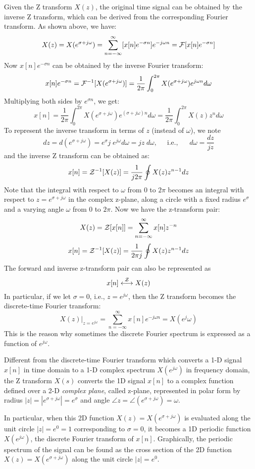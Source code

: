Given the Z transform $X(z)$, the original time signal can be obtained by 
the inverse Z transform, which can be derived from the corresponding Fourier 
transform. As shown above, we have:
\[ X(z)=X(e^{\sigma+j\omega})=\sum_{n=-\infty}^\infty [x[n] e^{-\sigma n}] 
e^{-j\omega n} ={\cal F}[x[n] e^{-\sigma n}]
\]
Now $x[n]e^{-\sigma n}$ can be obtained by the inverse Fourier transform:
\[ x[n] e^{-\sigma n}={\cal F}^{-1}[X(e^{\sigma+j\omega})]
=\frac{1}{2\pi}\int_0^{2\pi} X(e^{\sigma+j\omega}) e^{j\omega n} d\omega
\]
Multiplying both sides by $e^{\sigma n}$, we get:
\[ 
x[n]=\frac{1}{2\pi}\int_0^{2\pi} X(e^{\sigma+j\omega}) e^{(\sigma+j\omega) n} d\omega 
=\frac{1}{2\pi}\int_0^{2\pi} X(z) z^n d\omega 
\]
To represent the inverse transform in terms of $z$ (instead of $\omega$), we note
\[ dz=d(e^{\sigma+j\omega})=e^\sigma j\;e^{j\omega} d\omega=jz\;d\omega,
 \;\;\;\;\;\mbox{i.e.,}\;\;\;\;\;\;d\omega=\frac{dz}{jz}	\]
and the inverse Z transform can be obtained as:
\[ x[n]={\cal Z}^{-1}[X(z)]=\frac{1}{j2\pi}\oint X(z) z^{n-1} dz	\]
Note that the integral with respect to $\omega$ from $0$ to $2\pi$ becomes
an integral with respect to $z=e^{\sigma+j\omega}$ in the complex z-plane,
along a circle with a fixed radius $e^\sigma$ and a varying angle $\omega$ 
from $0$ to $2\pi$. Now we have the z-transform pair:
\[	X(z)={\cal Z}[x[n]]=\sum_{n=-\infty}^\infty x[n]z^{-n}	\]
\[	x[n]={\cal Z}^{-1}[X(z)]=\frac{1}{2\pi j}\oint X(z)z^{n-1} dz	\]
The forward and inverse z-transform pair can also be represented as
\[	x[n] \stackrel{ {\cal Z} }{\longleftrightarrow} X(z)	\]
In particular, if we let $\sigma=0$, i.e., $z=e^{j\omega}$, then the Z
transform becomes the discrete-time Fourier transform:
\[ X(z)\bigg|_{z=e^{j\omega}}=\sum_{n=-\infty}^\infty x[n] e^{-j\omega n}=X(e^j\omega) \]
This is the reason why sometimes the discrete Fourier spectrum is expressed 
as a function of $e^{j\omega}$.


Different from the discrete-time Fourier transform which converts a 1-D signal
$x[n]$ in time domain to a 1-D complex spectrum $X(e^{j\omega})$ in frequency
domain, the Z transform $X(s)$ converts the 1D signal $x[n]$ to a complex 
function defined over a 2-D {\em complex plane}, called z-plane, represented
in polar form by radius $|z|=|e^{\sigma+j\omega}|=e^\sigma$ and angle 
$\angle z=\angle(e^{\sigma+j\omega})=\omega$. 

In particular, when this 2D function $X(z)=X(e^{\sigma+j\omega})$ is evaluated 
along the unit circle $|z|=e^0=1$ corresponding to $\sigma=0$, it becomes a 
1D periodic function $X(e^{j\omega})$, the discrete Fourier transform of $x[n]$. 
Graphically, the periodic spectrum of the signal can be found as the cross 
section of the 2D function $X(z)=X(e^{\sigma+j\omega})$ along the unit circle
$|z|=e^0$.

